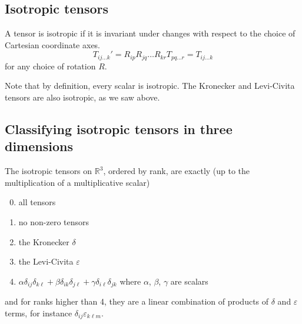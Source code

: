\subsection{Isotropic tensors}
\begin{definition}
	A tensor is isotropic if it is invariant under changes with respect to the choice of Cartesian coordinate axes.
	\[
		T_{ij\dots k}' = R_{ip} R_{jq} \dots R_{kr} T_{pq\dots r} = T_{ij\dots k}
	\]
	for any choice of rotation \(R\).
\end{definition}
\noindent Note that by definition, every scalar is isotropic.
The Kronecker and Levi-Civita tensors are also isotropic, as we saw above.

\subsection{Classifying isotropic tensors in three dimensions}
\begin{proposition}
	The isotropic tensors on \(\mathbb R^3\), ordered by rank, are exactly (up to the multiplication of a multiplicative scalar)
	\begin{enumerate}[{Rank} 1:]
		\setcounter{enumi}{-1}
		\item all tensors
		\item no non-zero tensors
		\item the Kronecker \(\delta\)
		\item the Levi-Civita \(\varepsilon\)
		\item \(\alpha \delta_{ij} \delta_{k\ell} + \beta \delta_{ik} \delta_{j\ell} + \gamma \delta_{i\ell} \delta_{jk}\) where \(\alpha\), \(\beta\), \(\gamma\) are scalars
	\end{enumerate}
	and for ranks higher than 4, they are a linear combination of products of \(\delta\) and \(\varepsilon\) terms, for instance \(\delta_{ij}\varepsilon_{k\ell m}\).
\end{proposition}
